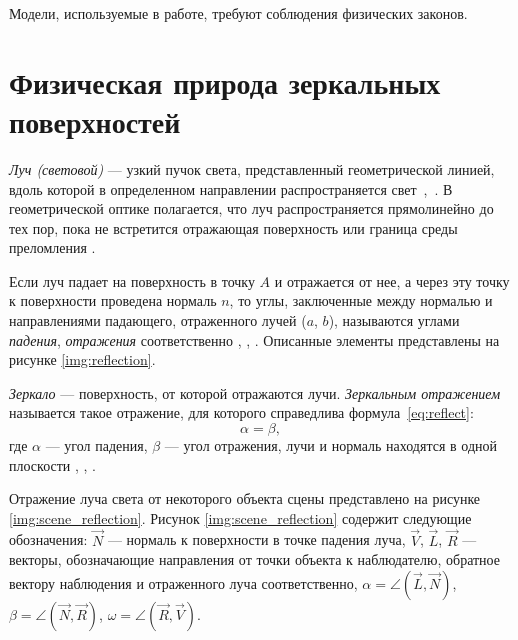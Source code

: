 Модели, используемые в работе, требуют соблюдения физических законов.

\section{Физическая природа зеркальных поверхностей}

\textit{Луч (световой)} --- узкий пучок света, представленный геометрической линией, вдоль которой в определенном направлении распространяется свет~\cite{тюрин2005физика},~\cite{оптика20036}. 
В геометрической оптике полагается, что луч распространяется прямолинейно до тех пор, пока не встретится отражающая поверхность или граница среды преломления \cite{порев2002компьютерная}.

Если луч падает на поверхность в точку $A$ и отражается от нее, а через эту точку к поверхности проведена нормаль $n$, то углы, заключенные между нормалью и направлениями падающего, отраженного лучей ($a$, $b$), называются углами \textit{падения}, \textit{отражения} соответственно \cite{тюрин2005физика}, \cite{оптика20036}, \cite{rodionov}.
Описанные элементы представлены на рисунке \ref{img:reflection}.


\textit{Зеркало} --- поверхность, от которой отражаются лучи.
\textit{Зеркальным отражением} называется такое отражение, для которого справедлива формула~\ref{eq:reflect}:
\begin{equation}\label{eq:reflect}
	\alpha=\beta,
\end{equation}
где $\alpha$ --- угол падения, $\beta$ --- угол отражения, лучи и нормаль находятся в одной плоскости \cite{порев2002компьютерная}, \cite{оптика20036}, \cite{rodionov}.

Отражение луча света от некоторого объекта сцены представлено на рисунке \ref{img:scene_reflection}.
Рисунок \ref{img:scene_reflection} содержит следующие обозначения: $\overrightarrow N$ --- нормаль к поверхности в точке падения луча, $\overrightarrow V$, $\overrightarrow L$, $\overrightarrow R$ --- векторы, обозначающие направления от точки объекта к наблюдателю, обратное вектору наблюдения и отраженного луча соответственно, $\alpha = \angle (\overrightarrow{L}, \overrightarrow{N})$, $\beta = \angle (\overrightarrow{N}, \overrightarrow{R})$, $\omega = \angle (\overrightarrow{R}, \overrightarrow{V})$.


